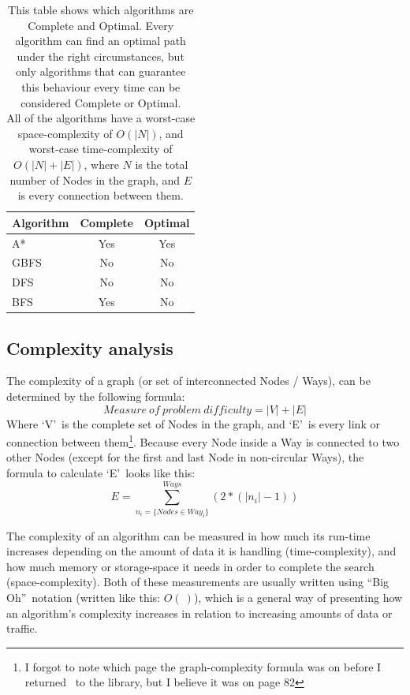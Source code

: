 \begin{table}[h]
	\begin{tabular}{| l | c | c |}
		\hline
		Algorithm & Complete & Optimal\\
		\hline
		A* & Yes & Yes\\
		\hline
		GBFS & No & No\\
		\hline
		DFS & No & No\\
		\hline
		BFS & Yes & No\\
		\hline
	\end{tabular}
	\caption[Completeness and Optimality of implemented Search-algorithms]{This table shows which algorithms are Complete and Optimal. Every algorithm can find an optimal path under the right circumstances, but only algorithms that can guarantee this behaviour every time can be considered Complete or Optimal.\\All of the algorithms have a worst-case space-complexity of $O(|N|)$, and worst-case time-complexity of $O(|N|+|E|)$, where $N$ is the total number of Nodes in the graph, and $E$ is every connection between them.}
	\label{tab:completeOptimal}
\end{table}

\newpage
\subsection{Complexity analysis}\label{sec:complexityAnalysis}
The complexity of a graph (or set of interconnected Nodes / Ways), can be determined by the following formula: $$Measure~of~problem~difficulty=|V|+|E|$$ Where \textquoteleft V\textquoteright~is the complete set of Nodes in the graph, and \textquoteleft E\textquoteright~is every link or connection between them\cite[p.82] {RN27}\footnote{I forgot to note which page the graph-complexity formula was on before I returned \cite{RN27}~to the library, but I believe it was on page 82}.
Because every Node inside a Way is connected to two other Nodes (except for the first and last Node in non-circular Ways), the formula to calculate \textquoteleft E\textquoteright~looks like this: $$E=\sum\limits_{n_i=\{Nodes\in Way_i\}}^{Ways}(2*(|n_i| - 1))$$

The complexity of an algorithm can be measured in how much its run-time increases depending on the amount of data it is handling (time-complexity), and how much memory or storage-space it needs in order to complete the search (space-complexity). Both of these measurements are usually written using \textquotedblleft Big Oh\textquotedblright~notation (written like this: $O(~)$\cite[P.82 \& P.1037]{RN27}), which is a general way of presenting how an algorithm's complexity increases in relation to increasing amounts of data or traffic.

